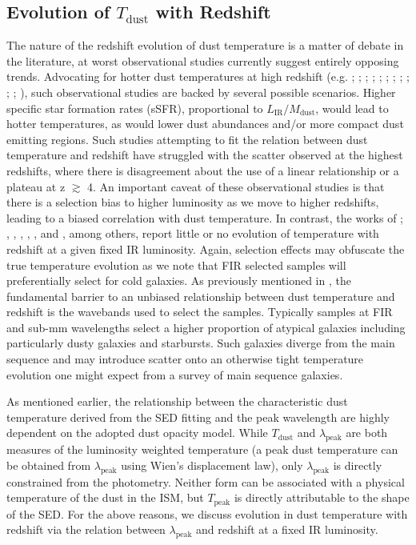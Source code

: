 \subsection{Evolution of $T_{\textrm{dust}}$ with Redshift}

The nature of the redshift evolution of dust temperature is a matter of debate in the literature, at worst observational studies currently suggest entirely opposing trends. Advocating for hotter dust temperatures at high redshift (e.g. \citealt{Magdis_2012}; \citealt{Magnelli_2014}; \citealt{Swinbank_2014}; \citealt{Bethermin_2015}; \citealt{Faisst_2017}; \citealt{Schreiber_2018}; \citealt{Zavala_2018b}; \citealt{Liang_2019}; \citealt{Ma_2019}; \citealt{Faisst_2020}; \citealt{Bakx_2021}; \citealt{Witstok_2023}), such observational studies are backed by several possible scenarios. Higher specific star formation rates (sSFR), proportional to $L_{\textrm{IR}}/M_{\textrm{dust}}$, would lead to hotter temperatures, as would lower dust abundances and/or more compact dust emitting regions. Such studies attempting to fit the relation between dust temperature and redshift have struggled with the scatter observed at the highest redshifts, where there is disagreement about the use of a linear relationship or a plateau at z $\gtrsim$ 4. An important caveat of these observational studies is that there is a selection bias to higher luminosity as we move to higher redshifts, leading to a biased correlation with dust temperature. In contrast, the works of \citealt{Casey_2018}; \citealt{Jin_2019}, \citealt{Lim_2020a}, \citealt{Dudzeviciute_2020}, \citealt{Reuter_2020}, \citealt{Barger_2022}, \citealt{Drew_2022} and \citealt{Witstok_2023}, among others, report little or no evolution of temperature with redshift at a given fixed IR luminosity. Again, selection effects may obfuscate the true temperature evolution as we note that FIR selected samples will preferentially select for cold galaxies. As previously mentioned in \citealt{Bendo_2023}, the fundamental barrier to an unbiased relationship between dust temperature and redshift is the wavebands used to select the samples. Typically samples at FIR and sub-mm wavelengths select a higher proportion of atypical galaxies including particularly dusty galaxies and starbursts. Such galaxies diverge from the main sequence and may introduce scatter onto an otherwise tight temperature evolution one might expect from a survey of main sequence galaxies.

As mentioned earlier, the relationship between the characteristic dust temperature derived from the SED fitting and the peak wavelength are highly dependent on the adopted dust opacity model. While $T_{\textrm{dust}}$ and $\lambda_{\textrm{peak}}$ are both measures of the luminosity weighted temperature (a peak dust temperature can be obtained from $\lambda_{\textrm{peak}}$ using Wien's displacement law), only $\lambda_{\textrm{peak}}$ is directly constrained from the photometry. Neither form can be associated with a physical temperature of the dust in the ISM, but $T_{\textrm{peak}}$ is directly attributable to the shape of the SED. For the above reasons, we discuss evolution in dust temperature with redshift via the relation between $\lambda_{\textrm{peak}}$ and redshift at a fixed IR luminosity.

